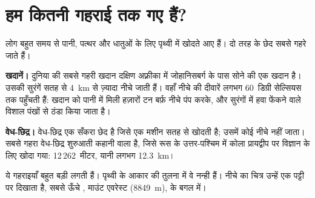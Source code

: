 \section{हम कितनी गहराई तक गए हैं?}

लोग बहुत समय से पानी, पत्थर और धातुओं के लिए पृथ्वी में खोदते आए हैं।
दो तरह के छेद सबसे गहरे जाते हैं।

\textbf{खदानें।} दुनिया की सबसे गहरी खदान दक्षिण अफ़्रीका में जोहानिसबर्ग के पास
सोने की एक खदान है। उसकी सुरंगें सतह से 4~km से ज़्यादा नीचे जाती हैं। वहाँ
नीचे  की दीवारें लगभग 60~डिग्री सेल्सियस तक पहुँचती हैं: खदान को पानी में
मिली हज़ारों टन बर्फ़ नीचे पंप करके, और सुरंगों में हवा फेंकने वाले विशाल पंखों से
ठंडा किया जाता है।

\textbf{वेध-छिद्र।} वेध-छिद्र एक सँकरा छेद है जिसे एक मशीन सतह से खोदती है; उसमें
कोई नीचे नहीं जाता। सबसे गहरा वेध-छिद्र शुरुआती कहानी वाला है, जिसे रूस के
उत्तर-पश्चिम में कोला प्रायद्वीप पर विज्ञान के लिए खोदा गया:
12\,262~मीटर, यानी लगभग 12.3~km।

ये गहराइयाँ बहुत बड़ी लगती हैं। पृथ्वी के आकार की तुलना में वे नन्ही हैं। नीचे
का चित्र उन्हें एक पट्टी पर दिखाता है, सबसे ऊँचे , माउंट एवरेस्ट (8849~m), के
बगल में।

